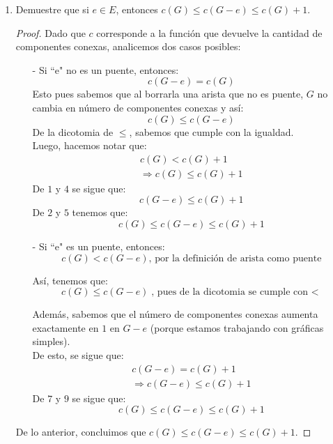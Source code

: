 \documentclass{article}
\begin{document}
  \begin{enumerate}
    \item Demuestre que si $e \in E$, entonces $c(G) \le c(G-e) \le c(G) + 1$.

      \renewcommand\qedsymbol{QED}
      \begin{proof}
        Dado que $c$ corresponde a la función que devuelve la cantidad de componentes
        conexas, analicemos dos casos posibles:

        \begin{itemize}
        \item[-] Si ``e" no es un puente, entonces:
          \begin{equation}
            c(G -e) = c(G)
          \end{equation}
          Esto pues sabemos que al borrarla una arista  que no es puente, $G$ no cambia en
          número de componentes conexas y así:
          \begin{equation}
            c(G) \leq c(G -e)
          \end{equation}
          De la dicotomia de $\leq$, sabemos que cumple con la igualdad. \\
          Luego, hacemos notar que:
          \begin{eqnarray}
            c(G) < c(G) +1\\
            \Rightarrow c(G) \leq c(G) +1
          \end{eqnarray}
          De $1$ y $4$ se sigue que:
          \begin{equation}
            c(G -e) \leq c(G) +1
          \end{equation}
          De $2$ y $5$ tenemos que:
          \[
          c(G) \le c(G-e) \le c(G) + 1
          \]

        \item[-] Si ``e" es un puente, entonces:
          \begin{equation}
            c(G) < c(G -e) \text{, por la definición de arista como puente}
          \end{equation}

          Así, tenemos que:
          \begin{equation}
            c(G) \leq c(G -e) \text{, pues de la dicotomia se cumple con $<$}
          \end{equation}

          Además, sabemos que el número de componentes conexas aumenta exactamente en
          $1$ en $G -e$ (porque estamos trabajando con gráficas simples). \\
          De esto, se sigue que:
          \begin{eqnarray}
            c(G -e) = c(G) +1\\
            \Rightarrow c(G -e) \leq c(G) +1
          \end{eqnarray}
          De $7$ y $9$ se sigue que:
          \[
          c(G) \le c(G-e) \le c(G) + 1
          \]
        \end{itemize}
        De lo anterior, concluimos que $c(G) \le c(G-e) \le c(G) + 1$. 
      \end{proof}


\end{enumerate}
\end{document}

